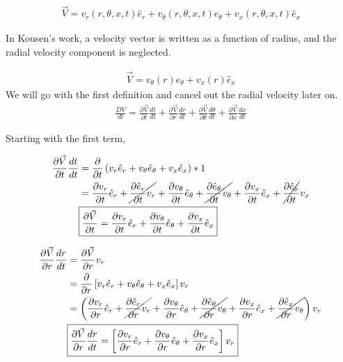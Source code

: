 \begin{align}
\vec{V} =
v_r(r,\theta,x,t) \hat{e}_r +
v_{\theta}(r,\theta,x,t) \hat{e}_{\theta} +
v_x(r,\theta,x,t) \hat{e}_x
\end{align}

In Kousen's work, a velocity vector is written as a function of radius, and the radial velocity component is neglected.

\begin{align}
\vec{V} = v_{\theta}(r) \hat{e}_{\theta} +
v_x(r) \hat{e}_x
\end{align}
We will go with the first definition and cancel out the radial velocity later on.
\begin{align*}
\frac{DV}{dt} =
\frac{\partial \vec{V}}{ \partial t}\frac{dt}{dt} +
\frac{\partial \vec{V}}{ \partial r}\frac{dr}{dt} +
\frac{\partial \vec{V}}{ \partial \theta}\frac{d\theta}{dt} +
\frac{\partial \vec{V}}{ \partial x}\frac{dx}{dt} 
\end{align*}


Starting with the first term,

\begin{align*}
\frac{\partial \vec{V}}{ \partial t}\frac{dt}{dt}	
&= \frac{\partial}{\partial t}
\left(
v_r 	   \hat{e}_r +
v_{\theta} \hat{e}_{\theta} +
v_x		   \hat{e}_x
\right) * 1 \\ 
&=
\frac{\partial 		  v_r}{\partial t} 		\hat{e}_r +
\cancel{\frac{\partial  \hat{e}_r}{\partial t} 		v_r}       +
\frac{\partial v_{\theta}}{\partial t}		\hat{e}_{\theta} +
\cancel{\frac{\partial \hat{e}_{\theta}}{\partial t} v_{\theta}}  +
\frac{\partial v_x}{\partial t}\hat{e}_{x} +
\cancel{\frac{\partial \hat{e}_{x}}{\partial t}}v_x \\  
&\boxed{
	\frac{\partial \vec{V}}{ \partial t} = 
	\frac{\partial 		  v_r}{\partial t} 		\hat{e}_r +
	\frac{\partial v_{\theta}}{\partial t}		\hat{e}_{\theta} + 
	\frac{\partial v_x}{\partial t}\hat{e}_{x}}
\end{align*}

\begin{align*}
\frac{\partial \vec{V}}{ \partial r}\frac{dr}{dt} 
&= \frac{\partial \vec{V}}{ \partial r}v_r\\ 
&= \frac{\partial}{\partial r}
\left[
v_r 	   \hat{e}_r +
v_{\theta} \hat{e}_{\theta} +
v_x		   \hat{e}_x
\right]  v_r \\ 
&=
\left(
\frac{\partial v_r}{\partial r} 		\hat{e}_r +
\cancel{\frac{\partial  \hat{e}_r}{\partial r} 		v_r}       +
\frac{\partial v_{\theta}}{\partial r}		\hat{e}_{\theta} +
\cancel{\frac{\partial \hat{e}_{\theta}}{\partial r} v_{\theta}}  +
\frac{\partial v_x}{\partial r}\hat{e}_{x} +
\cancel{\frac{\partial \hat{e}_{x}}{\partial r} v_{\theta}} \right) v_r\\ 
&\boxed{ 
	\frac{\partial \vec{V}}{ \partial r}\frac{dr}{dt}     = \left[
	\frac{\partial 		  v_r}{\partial r} 		\hat{e}_r +
	\frac{\partial v_{\theta}}{\partial r}		\hat{e}_{\theta} +
	\frac{\partial v_x}{\partial r}\hat{e}_{x}\right] v_r} \\
\end{align*}

